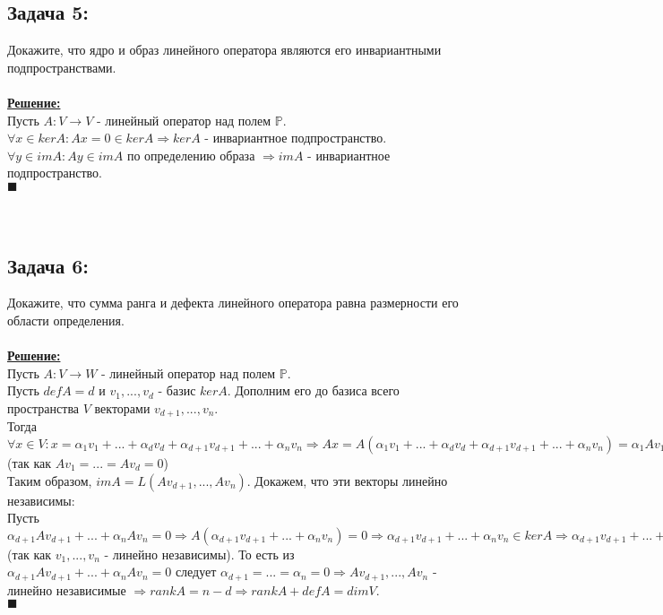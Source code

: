 \documentclass[a4paper,12pt,titlepage,final]{article}
\begin{document}
\subsection*{Задача 5:}
\noindent Докажите, что ядро и образ линейного оператора являются его инвариантными подпространствами. \\ \\
\textbf{\underline{Решение:}} \\
Пусть $A: V \rightarrow V$ - линейный оператор над полем $\mathbb{P}$. \\
$\forall x \in kerA: Ax = 0 \in kerA \Rightarrow kerA$ - инвариантное подпространство. \\
$\forall y \in imA: Ay \in imA$ по определению образа $\Rightarrow imA$ - инвариантное подпространство. \\ $\blacksquare$ \\ \\ \\


\subsection*{Задача 6:}
\noindent Докажите, что сумма ранга и дефекта линейного оператора равна размерности его области определения. \\ \\
\textbf{\underline{Решение:}} \\
Пусть $A: V \rightarrow W$ - линейный оператор над полем $\mathbb{P}$. \\
Пусть $defA = d$ и $v_1, ... , v_d$ - базис $kerA$. Дополним его до базиса всего пространства $V$ векторами $v_{d+1}, ... , v_n$. \\
Тогда $\forall x \in V: x = \alpha_1 v_1 + ... + \alpha_d v_d + \alpha_{d+1} v_{d+1} + ... + \alpha_n v_n \Rightarrow
Ax = A(\alpha_1 v_1 + ... + \alpha_d v_d + \alpha_{d+1} v_{d+1} + ... + \alpha_n v_n) =
\alpha_1 Av_1 + ... + \alpha_d Av_d + \alpha_{d+1} Av_{d+1} + ... + \alpha_n Av_n = \alpha_{d+1} Av_{d+1} + ... + \alpha_n Av_n$ (так как $Av_1 = ... = Av_d = 0$) \\
Таким образом, $imA = L(Av_{d+1}, ... , Av_n)$. Докажем, что эти векторы линейно независимы: \\
Пусть $\alpha_{d+1} Av_{d+1} + ... + \alpha_n Av_n = 0 \Rightarrow A(\alpha_{d+1} v_{d+1} + ... + \alpha_n v_n) = 0
\Rightarrow \alpha_{d+1} v_{d+1} + ... + \alpha_n v_n \in kerA \Rightarrow \alpha_{d+1} v_{d+1} + ... + \alpha_n v_n = \alpha_1 v_1 + ... + \alpha_d v_d \Rightarrow
\alpha_1 v_1 + ... + \alpha_d v_d - \alpha_{d+1} v_{d+1} - ... - \alpha_n v_n = 0 \Rightarrow \alpha_{d+1} = ... = \alpha_n = 0$ (так как $v_1, ... , v_n$ - линейно независимы).
То есть из $\alpha_{d+1} Av_{d+1} + ... + \alpha_n Av_n = 0$ следует $\alpha_{d+1} = ... = \alpha_n = 0 \Rightarrow Av_{d+1}, ... , Av_n$ - линейно независимые
$\Rightarrow rankA = n - d \Rightarrow rankA + defA = dimV$. \\ $\blacksquare$ \\ \\ \\
\end{document}
